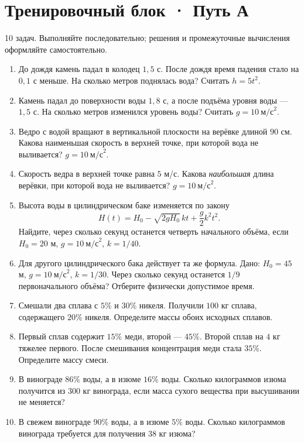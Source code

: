 \documentclass[a4paper,12pt]{article}
\newcommand{\sectiontitle}[1]{\needspace{6\baselineskip}\section*{\color{deepaccent}#1}}
\begin{document}
\sectiontitle{Тренировочный блок · Путь А}
\textcolor{textgray}{10 задач. Выполняйте последовательно; решения и промежуточные вычисления оформляйте самостоятельно.}
\begin{enumerate}[label=\textbf{\arabic*.},wide=0pt]
\item До дождя камень падал в колодец \(1{,}5\) с. После дождя время падения стало на \(0{,}1\) с меньше. На сколько метров поднялась вода? Считать \(h=5t^2\).

\item Камень падал до поверхности воды \(1{,}8\) с, а после подъёма уровня воды --- \(1{,}5\) с. На сколько метров изменился уровень воды? Считать \(g=10\ \text{м/с}^2\).

\item Ведро с водой вращают в вертикальной плоскости на верёвке длиной \(90\) см. Какова наименьшая скорость в верхней точке, при которой вода не выливается? \(g=10\ \text{м/с}^2\).

\item Скорость ведра в верхней точке равна \(5\) м/с. Какова \emph{наибольшая} длина верёвки, при которой вода не выливается? \(g=10\ \text{м/с}^2\).

\item Высота воды в цилиндрическом баке изменяется по закону
\[
H(t)=H_0-\sqrt{2gH_0}\,kt+\frac g2 k^2t^2.
\]
Найдите, через сколько секунд останется четверть начального объёма, если \(H_0=20\) м, \(g=10\ \text{м/с}^2\), \(k=1/40\).

\item Для другого цилиндрического бака действует та же формула. Дано: \(H_0=45\) м, \(g=10\ \text{м/с}^2\), \(k=1/30\). Через сколько секунд останется \(1/9\) первоначального объёма? Отберите физически допустимое время.

\item Смешали два сплава с \(5\%\) и \(30\%\) никеля. Получили \(100\) кг сплава, содержащего \(20\%\) никеля. Определите массы обоих исходных сплавов.

\item Первый сплав содержит \(15\%\) меди, второй --- \(45\%\). Второй сплав на \(4\) кг тяжелее первого. После смешивания концентрация меди стала \(35\%\). Определите массу смеси.

\item В винограде \(86\%\) воды, а в изюме \(16\%\) воды. Сколько килограммов изюма получится из \(300\) кг винограда, если масса сухого вещества при высушивании не меняется?

\item В свежем винограде \(90\%\) воды, а в изюме \(5\%\) воды. Сколько килограммов винограда требуется для получения \(38\) кг изюма? 
\end{enumerate}
\end{document}

